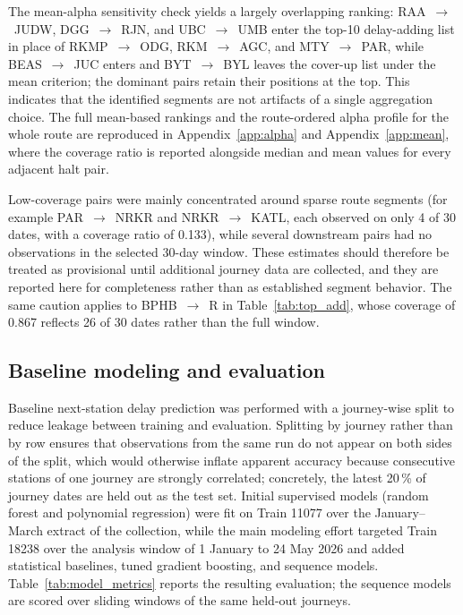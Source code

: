 \documentclass[a4paper,fleqn]{cas-dc}
\begin{document}
The mean-alpha sensitivity check yields a largely overlapping ranking:
RAA~$\rightarrow$~JUDW, DGG~$\rightarrow$~RJN, and UBC~$\rightarrow$~UMB
enter the top-10 delay-adding list in place of RKMP~$\rightarrow$~ODG,
RKM~$\rightarrow$~AGC, and MTY~$\rightarrow$~PAR, while
BEAS~$\rightarrow$~JUC enters and BYT~$\rightarrow$~BYL leaves the cover-up
list under the mean criterion; the dominant pairs retain their positions at
the top. This indicates that the identified segments are not artifacts of a
single aggregation choice. The full mean-based rankings and the route-ordered
alpha profile for the whole route are reproduced in Appendix~\ref{app:alpha}
and Appendix~\ref{app:mean}, where the coverage ratio is reported alongside
median and mean values for every adjacent halt pair.

Low-coverage pairs were mainly concentrated around sparse route segments (for
example PAR~$\rightarrow$~NRKR and NRKR~$\rightarrow$~KATL, each observed on
only 4 of 30 dates, with a coverage ratio of 0.133), while several downstream
pairs had no observations in the selected 30-day window. These estimates
should therefore be treated as provisional until additional journey data are
collected, and they are reported here for completeness rather than as
established segment behavior. The same caution applies to
BPHB~$\rightarrow$~R in Table~\ref{tab:top_add}, whose coverage of 0.867
reflects 26 of 30 dates rather than the full window.

\subsection{Baseline modeling and evaluation}
Baseline next-station delay prediction was performed with a journey-wise split
to reduce leakage between training and evaluation. Splitting by journey rather
than by row ensures that observations from the same run do not appear on both
sides of the split, which would otherwise inflate apparent accuracy because
consecutive stations of one journey are strongly correlated; concretely, the
latest 20\,\% of journey dates are held out as the test set. Initial
supervised models (random forest \citep{breiman2001random} and polynomial
regression) were fit on Train 11077 over the January--March extract of the
collection, while the main modeling effort targeted Train 18238 over the
analysis window of 1 January to 24 May 2026 and added statistical baselines,
tuned gradient boosting, and sequence models. Table~\ref{tab:model_metrics}
reports the resulting evaluation; the sequence models are scored over sliding
windows of the same held-out journeys.
\end{document}
